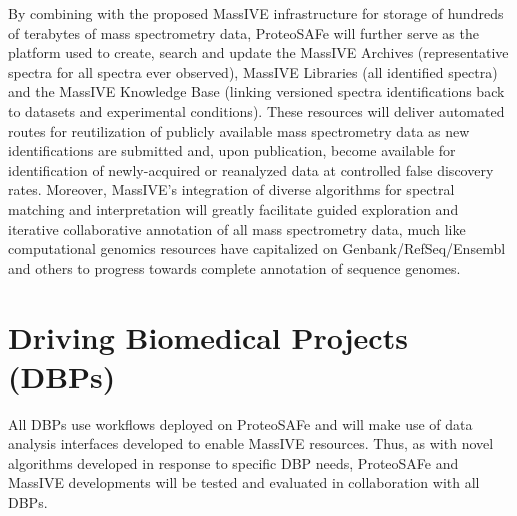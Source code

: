 \documentclass[arial,11pt]{article}
\newcommand{\SF}[1]{\textsf{#1}}
\newcommand{\SYSTEM}[0]{\SF{ProteoSAFe}\xspace}
\begin{document}
By combining with the proposed MassIVE infrastructure for storage of hundreds of terabytes of mass spectrometry data, \SYSTEM will further serve as the platform used to create, search and update the MassIVE Archives (representative spectra for all spectra ever observed), MassIVE Libraries (all identified spectra) and the MassIVE Knowledge Base (linking versioned spectra identifications back to datasets and experimental conditions). These resources will deliver automated routes for reutilization of publicly available mass spectrometry data as new identifications are submitted and, upon publication, become available for identification of newly-acquired or reanalyzed data at controlled false discovery rates. Moreover, MassIVE's integration of diverse algorithms for spectral matching and interpretation will greatly facilitate guided exploration and iterative collaborative annotation of all mass spectrometry data, much like computational genomics resources have capitalized on Genbank/RefSeq/Ensembl and others to progress towards complete annotation of sequence genomes.

\section{Driving Biomedical Projects (DBPs)}

All DBPs use workflows deployed on ProteoSAFe and will make use of data analysis interfaces developed to enable MassIVE resources. Thus, as with novel algorithms developed in response to specific DBP needs, ProteoSAFe and MassIVE developments will be tested and evaluated in collaboration with all DBPs.


%



\end{document}
